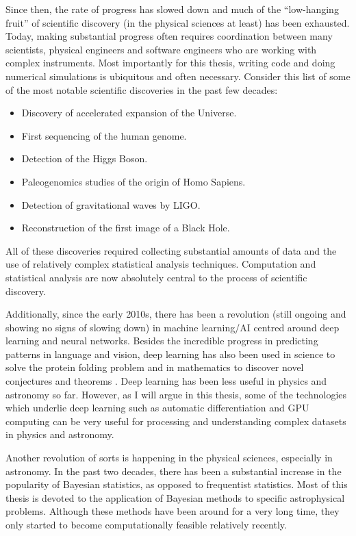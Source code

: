 \documentclass[12pt,dvipsnames]{report}
\begin{document}
Since then, the rate of progress has slowed down and much of the ``low-hanging fruit'' 
of scientific discovery (in the physical sciences at least) has been exhausted.
Today, making substantial progress often requires 
coordination between many scientists, physical engineers and software engineers 
who are working with complex instruments. Most importantly for this thesis, writing code
and doing numerical simulations is ubiquitous and often necessary.
Consider this list of some of the most notable
scientific discoveries in the past few decades:
\begin{itemize}
    \item  Discovery of accelerated expansion of the Universe.
    \item  First sequencing of the human genome.
    \item  Detection of the Higgs Boson.
    \item  Paleogenomics studies of the origin of Homo Sapiens.
    \item  Detection of gravitational waves by LIGO.
    \item  Reconstruction of the first image of a Black Hole.
\end{itemize}
All of these discoveries required collecting substantial amounts of data and the use of
relatively complex statistical analysis techniques.
Computation and statistical analysis are now absolutely central to the process of scientific
discovery.

Additionally, since the early 2010s, there has been a revolution (still ongoing and 
showing no signs of slowing down) in machine learning/AI centred around 
deep learning and neural networks.
Besides the incredible progress in predicting patterns in language
and vision, deep learning has also been used in science to solve
the protein folding problem \citep{2021Natur.596..583J} and in mathematics 
to discover novel conjectures and theorems
\citep{2021Natur.600...70D}. Deep learning has been less useful in physics and
astronomy so far. However, as I will argue in this thesis, some of the technologies
which underlie deep learning such as automatic differentiation and GPU
computing can be very useful for processing and understanding complex datasets in physics 
and astronomy.

Another revolution of sorts is happening in the physical sciences, especially in astronomy.
In the past two decades, there has been a substantial increase in the popularity of Bayesian
statistics, as opposed to frequentist statistics. 
Most of this thesis is devoted to the application of Bayesian methods to specific 
astrophysical problems.
Although these methods have been around for a very long time, they only started to become 
computationally feasible relatively recently.
\end{document}
